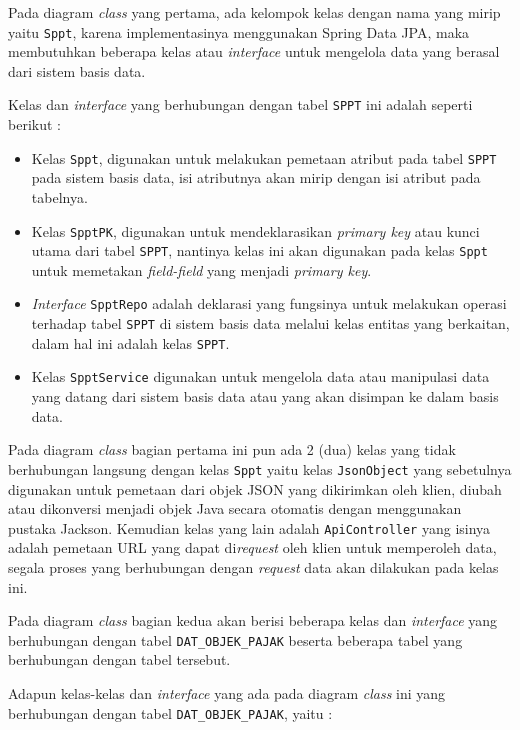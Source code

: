 Pada diagram \textit{class} yang pertama, ada kelompok kelas dengan nama yang mirip yaitu \texttt{Sppt}, karena implementasinya menggunakan Spring Data JPA, maka membutuhkan beberapa kelas atau \textit{interface} untuk mengelola data yang berasal dari sistem basis data.

Kelas dan \textit{interface} yang berhubungan dengan tabel \texttt{SPPT} ini adalah seperti berikut :

\begin{itemize}
	\item Kelas \texttt{Sppt}, digunakan untuk melakukan pemetaan atribut pada tabel \texttt{SPPT} pada sistem basis data, isi atributnya akan mirip dengan isi atribut pada tabelnya.
	\item Kelas \texttt{SpptPK}, digunakan untuk mendeklarasikan \textit{primary key} atau kunci utama dari tabel \texttt{SPPT}, nantinya kelas ini akan digunakan pada kelas \texttt{Sppt} untuk memetakan \textit{field-field} yang menjadi \textit{primary key}.
	\item \textit{Interface} \texttt{SpptRepo} adalah deklarasi yang fungsinya untuk melakukan operasi terhadap tabel \texttt{SPPT} di sistem basis data melalui kelas entitas yang berkaitan, dalam hal ini adalah kelas \texttt{SPPT}.
	\item Kelas \texttt{SpptService} digunakan untuk mengelola data atau manipulasi data yang datang dari sistem basis data atau yang akan disimpan ke dalam basis data.
\end{itemize}

Pada diagram \textit{class} bagian pertama ini pun ada 2 (dua) kelas yang tidak berhubungan langsung dengan kelas \texttt{Sppt} yaitu kelas \texttt{JsonObject} yang sebetulnya digunakan untuk pemetaan dari objek JSON yang dikirimkan oleh klien, diubah atau dikonversi menjadi objek Java secara otomatis dengan menggunakan pustaka Jackson. Kemudian kelas yang lain adalah \texttt{ApiController} yang isinya adalah pemetaan URL yang dapat di\textit{request} oleh klien untuk memperoleh data, segala proses yang berhubungan dengan \textit{request} data akan dilakukan pada kelas ini.

Pada diagram \textit{class} bagian kedua akan berisi beberapa kelas dan \textit{interface} yang berhubungan dengan tabel \texttt{DAT\_OBJEK\_PAJAK} beserta beberapa tabel yang berhubungan dengan tabel tersebut.

Adapun kelas-kelas dan \textit{interface} yang ada pada diagram \textit{class} ini yang berhubungan dengan tabel \texttt{DAT\_OBJEK\_PAJAK}, yaitu :

